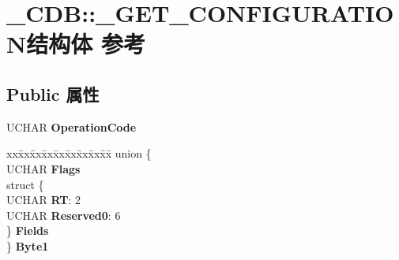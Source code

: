 \hypertarget{struct___c_d_b_1_1___g_e_t___c_o_n_f_i_g_u_r_a_t_i_o_n}{}\section{\+\_\+\+C\+DB\+:\+:\+\_\+\+G\+E\+T\+\_\+\+C\+O\+N\+F\+I\+G\+U\+R\+A\+T\+I\+O\+N结构体 参考}
\label{struct___c_d_b_1_1___g_e_t___c_o_n_f_i_g_u_r_a_t_i_o_n}
\subsection*{Public 属性}
\begin{DoxyCompactItemize}
\item 
\mbox{\label{struct___c_d_b_1_1___g_e_t___c_o_n_f_i_g_u_r_a_t_i_o_n_a6864192635332b5e606db54044ede70d}} 
U\+C\+H\+AR {\bfseries Operation\+Code}
\item 
\mbox{\label{struct___c_d_b_1_1___g_e_t___c_o_n_f_i_g_u_r_a_t_i_o_n_a82ee5b05904fc1e399ddb1092c132a23}} 
\begin{tabbing}
xx\=xx\=xx\=xx\=xx\=xx\=xx\=xx\=xx\=\kill
union \{\\
\>UCHAR {\bfseries Flags}\\
\>struct \{\\
\>\>UCHAR {\bfseries RT}: 2\\
\>\>UCHAR {\bfseries Reserved0}: 6\\
\>\} {\bfseries Fields}\\
\} {\bfseries Byte1}\\


\end{tabbing}
\end{DoxyCompactItemize}
